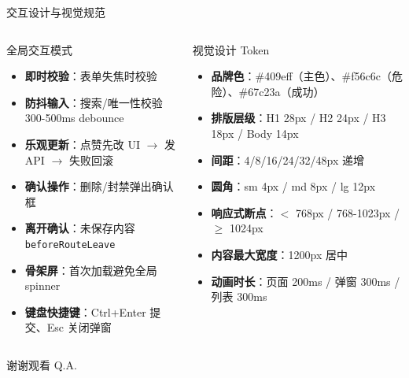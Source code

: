 \documentclass[aspectratio=169,UTF8]{ctexbeamer}
\begin{document}
\begin{frame}{交互设计与视觉规范}
    \begin{columns}[T]
        \begin{block}{全局交互模式}
            \begin{itemize}
                \item \textbf{即时校验}：表单失焦时校验
                \item \textbf{防抖输入}：搜索/唯一性校验 300-500ms debounce
                \item \textbf{乐观更新}：点赞先改 UI $\rightarrow$ 发 API $\rightarrow$ 失败回滚
                \item \textbf{确认操作}：删除/封禁弹出确认框
                \item \textbf{离开确认}：未保存内容 \texttt{beforeRouteLeave}
                \item \textbf{骨架屏}：首次加载避免全局 spinner
                \item \textbf{键盘快捷键}：Ctrl+Enter 提交、Esc 关闭弹窗
            \end{itemize}
        \end{block}
        \begin{block}{视觉设计 Token}
            \begin{itemize}
                \item \textbf{品牌色}：\#409eff（主色）、\#f56c6c（危险）、\#67c23a（成功）
                \item \textbf{排版层级}：H1 28px / H2 24px / H3 18px / Body 14px
                \item \textbf{间距}：4/8/16/24/32/48px 递增
                \item \textbf{圆角}：sm 4px / md 8px / lg 12px
                \item \textbf{响应式断点}：$<$ 768px / 768-1023px / $\ge$ 1024px
                \item \textbf{内容最大宽度}：1200px 居中
                \item \textbf{动画时长}：页面 200ms / 弹窗 300ms / 列表 300ms
            \end{itemize}
        \end{block}
    \end{columns}
\end{frame}

\begin{frame}
    \begin{center}
        \Huge 谢谢观看
        \vspace{1cm}
        \Large Q.A.
    \end{center}
\end{frame}
\end{document}
